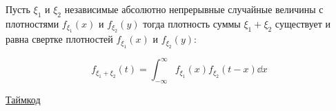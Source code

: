 
\begin{theorem}
  Пусть \(\xi_1\) и \(\xi_2\) независимые абсолютно непрерывные случайные
  величины с плотностями \(f_{\xi_1} (x)\) и \(f_{\xi_2} (y)\) тогда плотность
  суммы \(\xi_1 + \xi_2\) существует и равна свертке плотностей \(f_{\xi_1}
  (x)\) и \(f_{\xi_2} (y)\):

  \begin{equation*}
    f_{\xi_1 + \xi_2} (t)
    = \int_{-\infty}^{\infty} f_{\xi_1} (x) f_{\xi_2} (t - x) \dd x
  \end{equation*}
\end{theorem}

\todo \href{https://www.youtube.com/watch?v=hUjvwyM2HUg&list=PLd7QXkfmSY7ZOTP3bhPT3jGoIlXql8kkX&index=12}{Таймкод}
